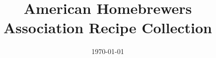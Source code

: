 \documentclass[10pt,oneside]{scrbook}
\begin{document}
\title{American Homebrewers Association Recipe Collection}
\date{\today}
\maketitle

\frontmatter

\tableofcontents

\mainmatter
\twocolumn













\backmatter


\end{document}

